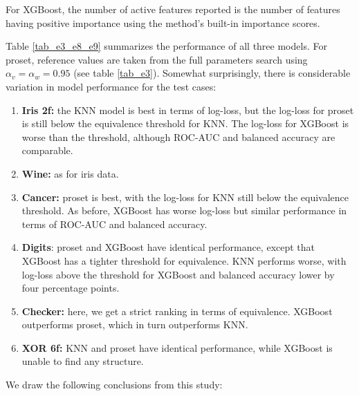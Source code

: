 For XGBoost, the number of active features reported is the number of features having positive importance using the method's built-in importance scores.\par
%
Table \ref{tab_e3_e8_e9} summarizes the performance of all three models.
For proset, reference values are taken from the full parameters search using $\alpha_v=\alpha_w=0.95$ (see table \ref{tab_e3}).
Somewhat surprisingly, there is considerable variation in model performance for the test cases:
%
\begin{enumerate}
\item\textbf{Iris 2f:} the KNN model is best in terms of log-loss, but the log-loss for proset is still below the equivalence threshold for KNN.
The log-loss for XGBoost is worse than the threshold, although ROC-AUC and balanced accuracy are comparable.
%
\item\textbf{Wine:} as for iris data.
%
\item\textbf{Cancer:} proset is best, with the log-loss for KNN still below the equivalence threshold.
As before, XGBoost has worse log-loss but similar performance in terms of ROC-AUC and balanced accuracy.
%
\item\textbf{Digits}: proset and XGBoost have identical performance, except that XGBoost has a tighter threshold for equivalence.
KNN performs worse, with log-loss above the threshold for XGBoost and balanced accuracy lower by four percentage points.
%
\item\textbf{Checker:} here, we get a strict ranking in terms of equivalence.
XGBoost outperforms proset, which in turn outperforms KNN.
%
\item\textbf{XOR 6f:} KNN and proset have identical performance, while XGBoost is unable to find any structure.
\end{enumerate}
%
We draw the following conclusions from this study:
%
